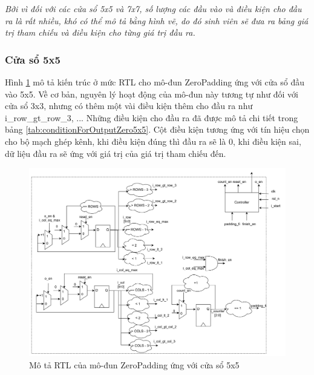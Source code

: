 \textit{
Bởi vì đối với các cửa sổ 5x5 và 7x7, số lượng các đầu vào và điều kiện cho đầu ra là rất nhiều, khó có thể mô tả bằng hình vẽ, do đó sinh viên sẽ đưa ra bảng giá trị tham chiếu và điều kiện cho từng giá trị đầu ra. }

\subsubsection{Cửa sổ 5x5}
Hình \ref{fig:zero5x5Architecture1} mô tả kiến trúc ở mức RTL cho mô-đun ZeroPadding ứng với cửa sổ đầu vào 5x5. Về cơ bản, nguyên lý hoạt động của mô-đun này tương tự như đối với cửa sổ 3x3, nhưng có thêm một vài điều kiện thêm cho đầu ra như i\_row\_gt\_row\_3, ... Những điều kiện cho đầu ra đã được mô tả chi tiết trong bảng \ref{tab:conditionForOutputZero5x5}. Cột điều kiện tương ứng với tín hiệu chọn cho bộ mạch ghép kênh, khi điều kiện đúng thì đầu ra sẽ là 0, khi điều kiện sai, dữ liệu đầu ra sẽ ứng với giá trị của giá trị tham chiếu đến.
\begin{figure}[!ht]
    \centering
    \includegraphics[width=0.9\linewidth]{figures/zero5x5Architecture1.png}
    \caption{Mô tả RTL của mô-đun ZeroPadding ứng với cửa sổ 5x5}
    \label{fig:zero5x5Architecture1}
\end{figure}


